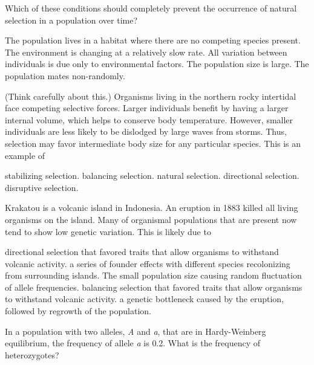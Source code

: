 
\question
Which of these conditions should completely prevent the occurrence of natural selection in a population over time?

\begin{choices}
\choice The population lives in a habitat where there are no competing species present. 
\choice The environment is changing at a relatively slow rate. 
\correctchoice All variation between individuals is due only to environmental factors. 
\choice The population size is large. 
\choice The population mates non-randomly.
\end{choices}

\question
(Think carefully about this.) Organisms living in the northern rocky intertidal face competing selective forces. Larger individuals benefit by having a larger internal volume, which helps to conserve body temperature. However, smaller individuals are less likely to be dislodged by large waves from storms. Thus, selection may favor intermediate body size for any particular species. This is an example of

\begin{choices}
\choice stabilizing selection. 
\correctchoice balancing selection. 
\choice natural selection. 
\choice directional selection. 
\choice disruptive selection. 
\end{choices}

\question
Krakatou is a volcanic island in Indonesia.  An eruption in 1883 killed all living organisms on the island.  Many of organismal populations that are present now tend to show low genetic variation.  This is likely due to

\begin{choices}
\choice directional selection that favored traits that allow organisms to withstand volcanic activity. 
\correctchoice a series of founder effects with different species recolonizing from surrounding islands. 
\choice The small population size causing random fluctuation of allele frequencies. 
\choice balancing selection that favored traits that allow organisms to withstand volcanic activity. 
\choice a genetic bottleneck caused by the eruption, followed by regrowth of the population. 
\end{choices}

\question
In a population with two alleles, \textit{A} and \textit{a}, that are in Hardy-Weinberg equilibrium, the frequency of allele \textit{a} is 0.2. What is the frequency of heterozygotes? 

\begin{choices}
\end{choices}

